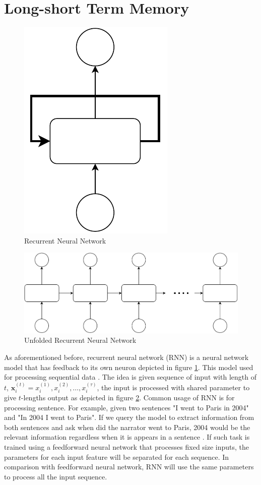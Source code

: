 \section{Long-short Term Memory}
    \begin{figure}[H]
        \centering
        \includegraphics[width=.15\linewidth]{images/rnn.pdf}
        \caption{Recurrent Neural Network}
        \label{fig:rnn}
    \end{figure}
    \begin{figure}[H]
        \centering
        \includegraphics[width=.6\linewidth]{images/unfolded_rnn.pdf}
        \caption{Unfolded Recurrent Neural Network}
        \label{fig:unfolded_rnn}
    \end{figure}
    As aforementioned before, recurrent neural network (RNN) is a
    neural network model that has feedback to its own neuron depicted
    in figure \ref{fig:rnn}. This model used for processing sequential
    data \citep{Goodfellow-et-al-2016}. The idea is given sequence of
    input with length of $t$, $\mathbf{x}_i^{(t)} = x_i^{(1)}, x_i^{(2)},
    \dots, x_i^{(\tau)}$, the input is processed with shared parameter to
    give $t$-lengths output as depicted in figure
    \ref{fig:unfolded_rnn}. Common usage of RNN is for processing
    sentence. For example, given two sentences "I went to Paris in
    2004" and "In 2004 I went to Paris". If we query the model to
    extract information from both sentences and ask when did the
    narrator went to Paris, 2004 would be the relevant information
    regardless when it is appears in a sentence
    \citep{Goodfellow-et-al-2016}. If such task is trained using a
    feedforward neural network that processes fixed size inputs, the
    parameters for each input feature will be separated for each
    sequence. In comparison with feedforward neural network, RNN will
    use the same parameters to process all the input sequence. 

